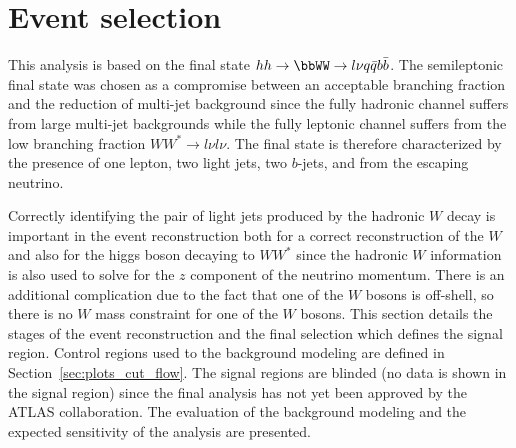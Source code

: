 \section{Event selection}
\label{sec:selection}
This analysis is based on the final state $hh \to \bbWW \to l \nu q\bar{q} b\bar{b}$. The semileptonic final state was chosen as a compromise between an acceptable branching fraction and the reduction of multi-jet background since the fully hadronic channel suffers from large multi-jet backgrounds while the fully leptonic channel suffers from the low branching fraction $WW^* \to l \nu l \nu$. %
The final state is therefore characterized by the presence of one lepton, two light jets, two $b$-jets, and \met from the escaping neutrino.

Correctly identifying the pair of light jets produced by the hadronic $W$ decay is important in the event reconstruction both for a correct reconstruction of the $W$ and also for the higgs boson decaying to $WW^*$ since the hadronic $W$ information is also used to solve for the $z$ component of the neutrino momentum. There is an additional complication due to the fact that one of the $W$ bosons is off-shell, so there is no $W$ mass constraint for one of the $W$ bosons. This section details the stages of the event reconstruction and the final selection which defines the signal region. Control regions used to the background modeling are defined in Section~\ref{sec:plots_cut_flow}. The signal regions are blinded (no data is shown in the signal region) since the final analysis has not yet been approved by the ATLAS collaboration. The evaluation of the background modeling and the expected sensitivity of the analysis are presented.

